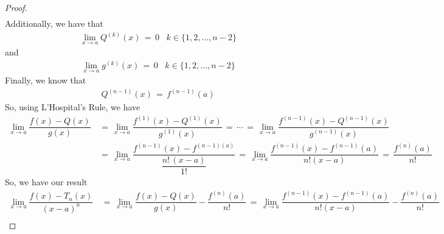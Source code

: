 \begin{theorem}
\begin{proof}
\begin{align*}
        \end{align*}
        Additionally, we have that
        \begin{align*}
            \lim_{x \longrightarrow a} Q^{(k)}(x) \hspace{2pt} = \hspace{2pt} 0 \hspace{10pt} k \in \{1, 2, \dots , n-2\}
        \end{align*}
        and
        \begin{align*}
            \lim_{x \longrightarrow a} g^{(k)}(x) \hspace{2pt} = \hspace{2pt} 0 \hspace{10pt} k \in \{1, 2, \dots , n-2\}
        \end{align*}
        Finally, we know that 
        \begin{align*}
            Q^{(n-1)}(x) \hspace{2pt} = \hspace{2pt} f^{(n-1)}(a)
        \end{align*}
        So, using L'Hospital's Rule, we have
        \begin{align*}
            \lim_{x \longrightarrow a} \dfrac{f(x) - Q(x)}{g(x)} \hspace{2pt} &= \hspace{2pt} \lim_{x \longrightarrow a} \dfrac{f^{(1)}(x) - Q^{(1)}(x)}{g^{(1)}(x)} \hspace{2pt} = \hspace{2pt} \cdots \hspace{2pt} = \hspace{2pt} \lim_{x \longrightarrow a} \dfrac{f^{(n-1)}(x) - Q^{(n-1)}(x)}{g^{(n-1)}(x)} \\[2ex]
            &= \hspace{2pt} \lim_{x \longrightarrow a} \dfrac{f^{(n-1)}(x) - f^{(n-1)(a)}}{\dfrac{n! \hspace{2pt} (x - a)}{1!}} \hspace{2pt} = \hspace{2pt} \lim_{x \longrightarrow a} \dfrac{f^{(n-1)}(x) - f^{(n-1)}(a)}{n! (x - a)} \hspace{2pt} = \hspace{2pt} \dfrac{f^{(n)}(a)}{n!}
        \end{align*}
        So, we have our result
        \begin{align*}
            \lim_{x \longrightarrow a} \dfrac{f(x) - T_{n}(x)}{(x-a)^{n}} \hspace{2pt} &= \hspace{2pt} \lim_{x \longrightarrow a} \dfrac{f(x) - Q(x)}{g(x)} - \dfrac{f^{(n)}(a)}{n!} \hspace{2pt} = \hspace{2pt} \lim_{x \longrightarrow a} \dfrac{f^{(n-1)}(x) - f^{(n-1)}(a)}{n!(x - a)} - \dfrac{f^{(n)}(a)}{n!} \\[2ex]

\end{align*}
\end{proof}
\end{theorem}
